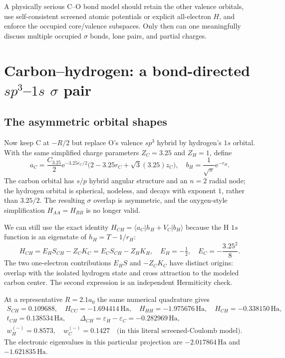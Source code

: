 \documentclass[11pt,letterpaper]{article}
\newcommand{\ha}{\,\mathrm{Ha}}
\newcommand{\e}{\mathrm e}
\begin{document}
A physically serious C--O bond model should retain the other valence orbitals, use self-consistent screened atomic potentials or explicit all-electron $H$, and enforce the occupied core/valence subspaces. Only then can one meaningfully discuss multiple occupied $\sigma$ bonds, lone pairs, and partial charges.

\section{Carbon--hydrogen: a bond-directed $sp^3$--$1s$ $\sigma$ pair}
\subsection{The asymmetric orbital shapes}
Now keep C at $-R/2$ but replace O's valence $sp^3$ hybrid by hydrogen's $1s$ orbital. With the same simplified charge parameters $Z_C=3.25$ and $Z_H=1$, define
\begin{equation}\label{eq:chhybrid}
\boxed{a_C=\frac{C_{3.25}}2\e^{-3.25r_C/2}\big(2-3.25r_C+\sqrt3(3.25)z_C\big),\quad
b_H=\frac1{\sqrt\pi}\e^{-r_H}.}
\end{equation}
The carbon orbital has $s/p$ hybrid angular structure and an $n=2$ radial node; the hydrogen orbital is spherical, nodeless, and decays with exponent $1$, rather than $3.25/2$. The resulting $\sigma$ overlap is asymmetric, and the oxygen-style simplification $H_{AA}=H_{BB}$ is no longer valid.

We can still use the exact identity $H_{CH}=\langle a_C\lvert h_H+V_C\rvert b_H\rangle$ because the H $1s$ function is an eigenstate of $h_H=T-1/r_H$:
\begin{equation}\label{eq:chsplit}
\boxed{H_{CH}=E_HS_{CH}-Z_CK_C=E_CS_{CH}-Z_HK_H,\quad E_H=-\tfrac12,\quad E_C=-\frac{3.25^2}{8}.}
\end{equation}
The two one-electron contributions $E_HS$ and $-Z_CK_C$ have distinct origins: overlap with the isolated hydrogen state and cross attraction to the modeled carbon center. The second expression is an independent Hermiticity check.

At a representative $R=2.1a_0$ the same numerical quadrature gives
\begin{equation}\label{eq:ch-values}
\begin{gathered}
S_{CH}=0.109688,\quad H_{CC}=-1.694414\ha,\quad H_{HH}=-1.975676\ha,\quad H_{CH}=-0.338150\ha,\\
t_{CH}=0.138534\ha,\qquad\Delta_{CH}=\varepsilon_H-\varepsilon_C=-0.282969\ha,\\
\boxed{w_H^{(-)}=0.8573,\quad w_C^{(-)}=0.1427\quad\text{(in this literal screened-Coulomb model)}.}
\end{gathered}
\end{equation}
The electronic eigenvalues in this particular projection are $-2.017864\ha$ and $-1.621835\ha$.
\end{document}
